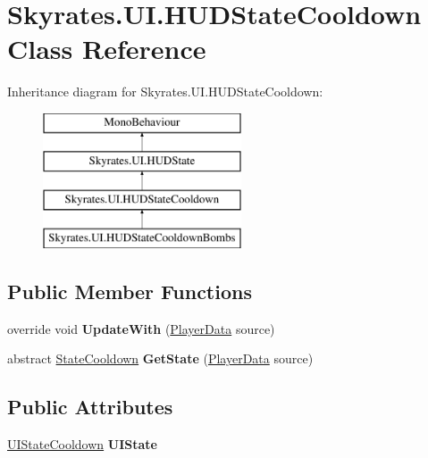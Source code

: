 \hypertarget{class_skyrates_1_1_u_i_1_1_h_u_d_state_cooldown}{\section{Skyrates.\-U\-I.\-H\-U\-D\-State\-Cooldown Class Reference}
\label{class_skyrates_1_1_u_i_1_1_h_u_d_state_cooldown}
}
Inheritance diagram for Skyrates.\-U\-I.\-H\-U\-D\-State\-Cooldown\-:\begin{figure}[H]
\begin{center}
\leavevmode
\includegraphics[height=4.000000cm]{class_skyrates_1_1_u_i_1_1_h_u_d_state_cooldown}
\end{center}
\end{figure}
\subsection*{Public Member Functions}
\begin{DoxyCompactItemize}
\item 
\hypertarget{class_skyrates_1_1_u_i_1_1_h_u_d_state_cooldown_a91ca20986e5428d49095a04bf354f9f2}{override void {\bfseries Update\-With} (\hyperlink{class_skyrates_1_1_data_1_1_player_data}{Player\-Data} source)}\label{class_skyrates_1_1_u_i_1_1_h_u_d_state_cooldown_a91ca20986e5428d49095a04bf354f9f2}

\item 
\hypertarget{class_skyrates_1_1_u_i_1_1_h_u_d_state_cooldown_ad0876825677227a5c6e89943f826356b}{abstract \hyperlink{class_skyrates_1_1_misc_1_1_state_cooldown}{State\-Cooldown} {\bfseries Get\-State} (\hyperlink{class_skyrates_1_1_data_1_1_player_data}{Player\-Data} source)}\label{class_skyrates_1_1_u_i_1_1_h_u_d_state_cooldown_ad0876825677227a5c6e89943f826356b}

\end{DoxyCompactItemize}
\subsection*{Public Attributes}
\begin{DoxyCompactItemize}
\item 
\hypertarget{class_skyrates_1_1_u_i_1_1_h_u_d_state_cooldown_a0eea132569654842e2ec4a51d217bdc9}{\hyperlink{class_skyrates_1_1_u_i_1_1_u_i_state_cooldown}{U\-I\-State\-Cooldown} {\bfseries U\-I\-State}}\label{class_skyrates_1_1_u_i_1_1_h_u_d_state_cooldown_a0eea132569654842e2ec4a51d217bdc9}

\end{DoxyCompactItemize}
